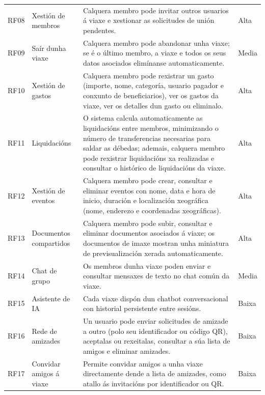 \begin{longtable}{@{}p{1.2cm}>{\raggedright\arraybackslash}p{3cm}p{8.5cm}p{1.5cm}@{}}
  RF08 & Xestión de membros         & Calquera membro pode invitar outros usuarios á viaxe e xestionar as solicitudes de unión pendentes.                                                                                 & Alta   \\[4pt]
  RF09 & Saír dunha viaxe           & Calquera membro pode abandonar unha viaxe; se é o último membro, a viaxe e todos os seus datos asociados elimínanse automaticamente.                                                & Media  \\[4pt]
  RF10 & Xestión de gastos          & Calquera membro pode rexistrar un gasto (importe, nome, categoría, usuario pagador e conxunto de beneficiarios), ver os gastos da viaxe, ver os detalles dun gasto ou eliminalo.            & Alta   \\[4pt]
  RF11 & Liquidacións               & O sistema calcula automaticamente as liquidacións entre membros, minimizando o número de transferencias necesarias para saldar as débedas; ademais, calquera membro pode rexistrar liquidacións xa realizadas e consultar o histórico de liquidacións da viaxe. & Alta   \\[4pt]
  RF12 & Xestión de eventos         & Calquera membro pode crear, consultar e eliminar eventos con nome, data e hora de inicio, duración e localización xeográfica (nome, enderezo e coordenadas xeográficas).          & Alta  \\[4pt]
  RF13 & Documentos compartidos     & Calquera membro pode subir, consultar e eliminar documentos asociados á viaxe; os documentos de imaxe mostran unha miniatura de previsualización xerada automaticamente.                                                                                                   & Alta   \\[4pt]
  RF14 & Chat de grupo              & Os membros dunha viaxe poden enviar e consultar mensaxes de texto no chat común da viaxe.                                                                                           & Media  \\[4pt]
  RF15 & Asistente de IA            & Cada viaxe dispón dun chatbot conversacional con historial persistente entre sesións.                                                                                               & Baixa  \\[4pt]
  RF16 & Rede de amizades           & Un usuario pode enviar solicitudes de amizade a outro (polo seu identificador ou código QR), aceptalas ou rexeitalas, consultar a súa lista de amigos e eliminar amizades.   & Baixa  \\[4pt]
  RF17 & Convidar amigos á viaxe    & Permite convidar amigos a unha viaxe directamente dende a lista de amizades, como atallo ás invitacións por identificador ou QR.                  & Baixa  \\
  \bottomrule
\end{longtable}

